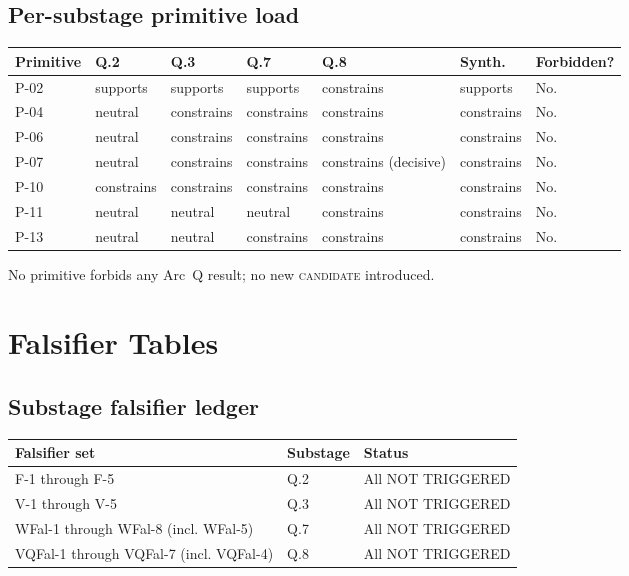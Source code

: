 \documentclass[11pt,a4paper]{article}
\begin{document}
\subsection{Per-substage primitive load}

\begin{center}
\small
\begin{tabular}{lllllll}
\toprule
\textbf{Primitive} & \textbf{Q.2} & \textbf{Q.3} & \textbf{Q.7} & \textbf{Q.8} & \textbf{Synth.} & \textbf{Forbidden?} \\
\midrule
P-02 & supports & supports & supports & constrains & supports & No. \\
P-04 & neutral & constrains & constrains & constrains & constrains & No. \\
P-06 & neutral & constrains & constrains & constrains & constrains & No. \\
P-07 & neutral & constrains & constrains & constrains (decisive) & constrains & No. \\
P-10 & constrains & constrains & constrains & constrains & constrains & No. \\
P-11 & neutral & neutral & neutral & constrains & constrains & No. \\
P-13 & neutral & neutral & constrains & constrains & constrains & No. \\
\bottomrule
\end{tabular}
\end{center}

\noindent No primitive forbids any Arc~Q result; no new \textsc{candidate} introduced.

\section{Falsifier Tables}

\subsection{Substage falsifier ledger}

\begin{center}
\begin{tabular}{lll}
\toprule
\textbf{Falsifier set} & \textbf{Substage} & \textbf{Status} \\
\midrule
F-1 through F-5 & Q.2 & All NOT TRIGGERED \\
V-1 through V-5 & Q.3 & All NOT TRIGGERED \\
WFal-1 through WFal-8 (incl. WFal-5) & Q.7 & All NOT TRIGGERED \\
VQFal-1 through VQFal-7 (incl. VQFal-4) & Q.8 & All NOT TRIGGERED \\
\bottomrule
\end{tabular}
\end{center}
\end{document}
